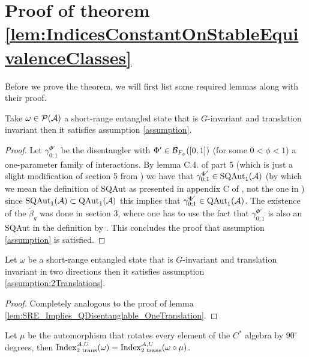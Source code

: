 \documentclass[11pt,a4paper,twoside]{article}
\numberwithin{equation}{section}
\begin{document}
	\section{Proof of theorem \ref{lem:IndicesConstantOnStableEquivalenceClasses}}\label{sec:ProofOfMainResult1}\label{sec:ProofOf:lem:IndicesConstantOnStableEquivalenceClasses}
	Before we prove the theorem, we will first list some required lemmas along with their proof.
	\begin{lemma}\label{lem:SRE_Implies_QDisentanglable_OneTranslation}
		Take $\omega\in\PP(\AA)$ a short-range entangled state that is $G$-invariant and translation invariant then it satisfies assumption \ref{assumption}.
	\end{lemma}
	\begin{proof}
		Let $\gamma^{\Phi'}_{0;1}$ be the disentangler with $\Phi'\in\BB_{F_\phi}([0,1])$ (for some $0<\phi<1$) a one-parameter family of interactions. By lemma C.4. of \cite{jappens2023spt} part 5 (which is just a slight modification of section 5 from \cite{ogata2021h3gmathbb}) we have that $\gamma^{\Phi'}_{0;1}\in\textrm{SQAut}_1(\AA)$ (by which we mean the definition of SQAut as presented in appendix C of \cite{jappens2023spt}, not the one in \cite{ogata2021h3gmathbb}) since $\textrm{SQAut}_1(\AA)\subset\QAut{\AA}$ this implies that $\gamma^{\Phi'}_{0;1}\in\QAut{\AA}$. The existence of the $\tilde{\beta}_g$ was done in \cite{ogata2021h3gmathbb} section 3, where one has to use the fact that $\gamma^{\Phi'}_{0;1}$ is also an SQAut in the definition by \cite{ogata2021h3gmathbb}. This concludes the proof that assumption \ref{assumption} is satisfied.
	\end{proof}
	\begin{lemma}\label{lem:SRE_Implies_QDisentanglable_TwoTranslations}
		Let $\omega$ be a short-range entangled state that is $G$-invariant and translation invariant in two directions then it satisfies assumption \ref{assumption:2Translations}.
	\end{lemma}
	\begin{proof}
		Completely analogous to the proof of lemma \ref{lem:SRE_Implies_QDisentanglable_OneTranslation}.
	\end{proof}
	\begin{lemma}\label{lem:RotationDoesn'tChangeH1Index}
		Let $\mu$ be the automorphism that rotates every element of the $C^*$ algebra by $90^\circ$ degrees, then $\textrm{Index}_{\text{2 trans}}^{\AA,U}(\omega)=\textrm{Index}_{\text{2 trans}}^{\AA,U}(\omega\circ\mu)$.
	\end{lemma}
\end{document}
